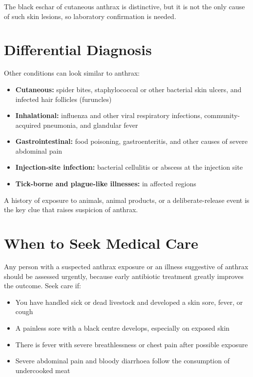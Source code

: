 The black eschar of cutaneous anthrax is distinctive, but it is not the only cause of such skin lesions, so laboratory confirmation is needed.

\section*{Differential Diagnosis}
Other conditions can look similar to anthrax:

\begin{itemize}
    \item \textbf{Cutaneous:} spider bites, staphylococcal or other bacterial skin ulcers, and infected hair follicles (furuncles)
    \item \textbf{Inhalational:} influenza and other viral respiratory infections, community-acquired pneumonia, and glandular fever
    \item \textbf{Gastrointestinal:} food poisoning, gastroenteritis, and other causes of severe abdominal pain
    \item \textbf{Injection-site infection:} bacterial cellulitis or abscess at the injection site
    \item \textbf{Tick-borne and plague-like illnesses:} in affected regions
\end{itemize}

A history of exposure to animals, animal products, or a deliberate-release event is the key clue that raises suspicion of anthrax.

\section*{When to Seek Medical Care}
Any person with a suspected anthrax exposure or an illness suggestive of anthrax should be assessed urgently, because early antibiotic treatment greatly improves the outcome. Seek care if:

\begin{itemize}
    \item You have handled sick or dead livestock and developed a skin sore, fever, or cough
    \item A painless sore with a black centre develops, especially on exposed skin
    \item There is fever with severe breathlessness or chest pain after possible exposure
    \item Severe abdominal pain and bloody diarrhoea follow the consumption of undercooked meat
\end{itemize}

